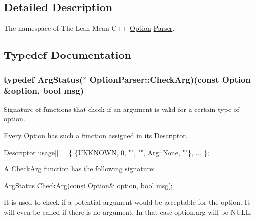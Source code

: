 \subsection{Detailed Description}
The namespace of The Lean Mean C++ \hyperlink{class_option_parser_1_1_option}{Option} \hyperlink{class_option_parser_1_1_parser}{Parser}. 

\subsection{Typedef Documentation}
\hypertarget{namespace_option_parser_aee9955553cc70fd9fd41849622680c6a}{
\subsubsection[{Check\-Arg}]{\setlength{\rightskip}{0pt plus 5cm}typedef {\bf Arg\-Status}($\ast$ Option\-Parser\-::\-Check\-Arg)(const {\bf Option} \&option, bool msg)}}\label{namespace_option_parser_aee9955553cc70fd9fd41849622680c6a}


Signature of functions that check if an argument is valid for a certain type of option. 

Every \hyperlink{class_option_parser_1_1_option}{Option} has such a function assigned in its \hyperlink{struct_option_parser_1_1_descriptor}{Descriptor}. 
\begin{DoxyCode}
Descriptor usage[] = \{ \{\hyperlink{_community_detection_8cpp_a0ba79095c558cb72ea2e8b277be1da39a6ce26a62afab55d7606ad4e92428b30c}{UNKNOWN}, 0, \textcolor{stringliteral}{""}, \textcolor{stringliteral}{""}, \hyperlink{struct_option_parser_1_1_arg_afd9e5e7362e4accc619fe7dee7098956}{Arg::None}, \textcolor{stringliteral}{""}\}, ...
       \};
\end{DoxyCode}


A Check\-Arg function has the following signature\-: 
\begin{DoxyCode}
\hyperlink{namespace_option_parser_ad237d47d58c66dea8dcf4f53ac11a6e4}{ArgStatus} \hyperlink{namespace_option_parser_aee9955553cc70fd9fd41849622680c6a}{CheckArg}(\textcolor{keyword}{const} Option& option, \textcolor{keywordtype}{bool} msg); 
\end{DoxyCode}


It is used to check if a potential argument would be acceptable for the option. It will even be called if there is no argument. In that case {\ttfamily option.\-arg} will be {\ttfamily N\-U\-L\-L}.

